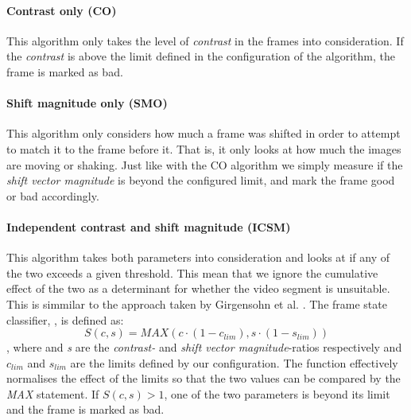 \paragraph{Contrast only (CO)}
%
This algorithm only takes the level of \textit{contrast} in the frames into consideration. If the \textit{contrast} is above the limit defined in the configuration of the algorithm, the frame is marked as bad.
%
\paragraph{Shift magnitude only (SMO)}
This algorithm only considers how much a frame was shifted in order to attempt to match it to the frame before it. That is, it only looks at how much the images are moving or shaking. Just like with the CO algorithm we simply measure if the \textit{shift vector magnitude} is beyond the configured limit, and mark the frame good or bad accordingly.
%
\paragraph{Independent contrast and shift magnitude (ICSM)}
This algorithm takes both parameters into consideration and looks at if any of the two exceeds a given threshold. This mean that we ignore the cumulative effect of the two as a determinant for whether the video segment is unsuitable. This is simmilar to the approach taken by Girgensohn et al. \cite{Girgensohn:2000:SAH:354401.354415}. The frame state classifier, , is defined as:
\[
S(c,s)=MAX(c \cdot (1-c_{lim}), s \cdot (1-s_{lim}))
\]
, where  and \textit{s} are the \textit{contrast-} and \textit{shift vector magnitude}-ratios respectively and $c_{lim}$ and $s_{lim}$ are the limits defined by our configuration. The function effectively normalises the effect of the limits so that the two values can be compared by the \textit{MAX} statement. If $S(c,s) > 1$, one of the two parameters is beyond its limit and the frame is marked as bad.\\\\
%
